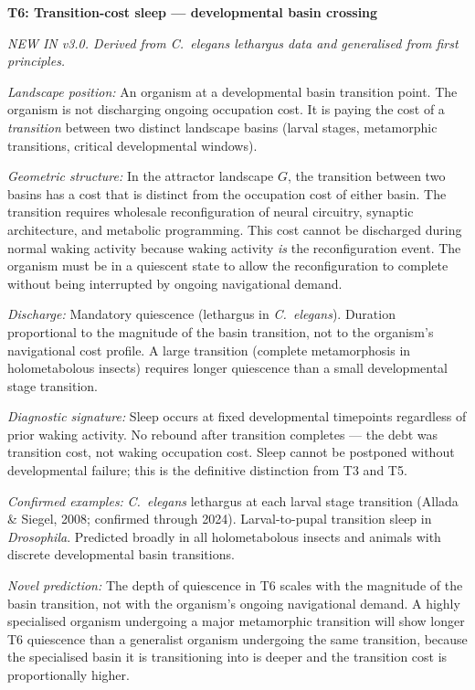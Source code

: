 \documentclass[10pt, a4paper]{article}
\begin{document}
\begin{mdframed}[
  backgroundcolor=newbox,
  linecolor=headergreen,
  linewidth=0.8pt,
  innertopmargin=0.6em,
  innerbottommargin=0.6em,
  innerleftmargin=0.8em,
  innerrightmargin=0.8em
]
\textbf{T6: Transition-cost sleep ---
developmental basin crossing}

\textit{NEW IN v3.0. Derived from
\textit{C.~elegans} lethargus data and
generalised from first principles.}

\textit{Landscape position:} An organism
at a developmental basin transition point.
The organism is not discharging ongoing
occupation cost. It is paying the cost
of a \textit{transition} between two
distinct landscape basins (larval stages,
metamorphic transitions, critical
developmental windows).

\textit{Geometric structure:} In the
attractor landscape $G$, the transition
between two basins has a cost that is
distinct from the occupation cost of
either basin. The transition requires
wholesale reconfiguration of neural
circuitry, synaptic architecture, and
metabolic programming. This cost cannot
be discharged during normal waking
activity because waking activity
\textit{is} the reconfiguration event.
The organism must be in a quiescent
state to allow the reconfiguration to
complete without being interrupted by
ongoing navigational demand.

\textit{Discharge:} Mandatory quiescence
(lethargus in \textit{C.~elegans}).
Duration proportional to the magnitude
of the basin transition, not to the
organism's navigational cost profile.
A large transition (complete metamorphosis
in holometabolous insects) requires
longer quiescence than a small
developmental stage transition.

\textit{Diagnostic signature:} Sleep
occurs at fixed developmental timepoints
regardless of prior waking activity.
No rebound after transition completes
--- the debt was transition cost, not
waking occupation cost. Sleep cannot
be postponed without developmental
failure; this is the definitive
distinction from T3 and T5.

\textit{Confirmed examples:}
\textit{C.~elegans} lethargus at each
larval stage transition (Allada \&
Siegel, 2008; confirmed through 2024).
Larval-to-pupal transition sleep in
\textit{Drosophila}. Predicted broadly
in all holometabolous insects and
animals with discrete developmental
basin transitions.

\textit{Novel prediction:} The depth
of quiescence in T6 scales with the
magnitude of the basin transition, not
with the organism's ongoing navigational
demand. A highly specialised organism
undergoing a major metamorphic transition
will show longer T6 quiescence than a
generalist organism undergoing the same
transition, because the specialised basin
it is transitioning into is deeper and
the transition cost is proportionally
higher.
\end{mdframed}
\end{document}
